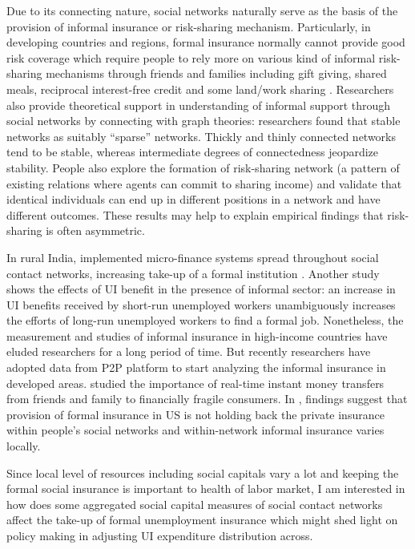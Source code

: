 \documentclass{article}
\begin{document}
Due to its connecting nature, social networks naturally serve as the basis of the provision of informal insurance or risk-sharing mechanism. Particularly, in developing countries and regions, formal insurance normally cannot provide good risk coverage which require people to rely more on various kind of informal risk-sharing mechanisms through friends and families including gift giving, shared meals, reciprocal interest-free credit and some land/work sharing \cite{coate1993reciprocity}. Researchers also provide theoretical support in understanding of informal support through social networks by connecting with graph theories: researchers found that stable networks as suitably “sparse” networks. Thickly and thinly connected networks tend to be stable, whereas intermediate degrees of connectedness jeopardize stability. People also explore the formation of risk-sharing network (a pattern of existing relations where agents can commit to sharing income) and validate that identical individuals can end up in different positions in a network and have different outcomes. These results may help to explain empirical findings that risk-sharing is often asymmetric. \cite{bloch2008informal}\cite{risksharing} 

In rural India, implemented micro-finance systems spread throughout social contact networks, increasing take-up of a formal institution  \cite{microfinance}. Another study shows the effects of UI benefit in the presence of informal sector: an increase in UI benefits received by short-run unemployed workers unambiguously increases the efforts of long-run unemployed workers to find a formal job\cite{informalsector}. Nonetheless, the measurement and studies of informal insurance in high-income countries have eluded researchers for a long period of time. But recently researchers have adopted data from P2P platform to start analyzing the informal insurance in developed areas. \cite{balyuk2021friends} studied the importance of real-time instant money transfers from friends and family to financially fragile consumers. In \cite{coombs2022crowding}, findings suggest that provision of formal insurance in US is not holding back the private insurance within people's social networks and within-network informal insurance varies locally. 

Since local level of resources including social capitals vary a lot and keeping the formal social insurance is important to health of labor market, I am interested in how does some aggregated social capital measures of social contact networks affect the take-up of formal unemployment insurance which might shed light on policy making in adjusting UI expenditure distribution across.
\end{document}
